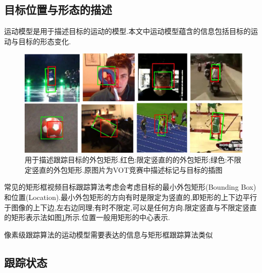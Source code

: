 \subsection{目标位置与形态的描述}
运动模型是用于描述目标的运动的模型.本文中运动模型蕴含的信息包括目标的运动与目标的形态变化.
\par
\begin{figure}[htbp!]
    \centering
    \includegraphics[width = 1.\textwidth]{chap/img/overlap_examples.pdf}
    \caption{用于描述跟踪目标的外包矩形.红色:限定竖直的的外包矩形;绿色:不限定竖直的外包矩形.原图片为VOT竞赛中描述标记与目标的插图\supercite{VOT_TPAMI}}\label{fig:bunding_boxes}
\end{figure}
\par
常见的矩形框视频目标跟踪算法考虑会考虑目标的最小外包矩形(Bounding Box)和位置(Location).最小外包矩形的方向有时是限定为竖直的,即矩形的上下边平行于图像的上下边,左右边同理;有时不限定,可以是任何方向.限定竖直与不限定竖直的矩形表示法如图\ref{fig:bunding_boxes}所示.位置一般用矩形的中心表示.
\par
像素级跟踪算法的运动模型需要表达的信息与矩形框跟踪算法类似

\subsection{跟踪状态}